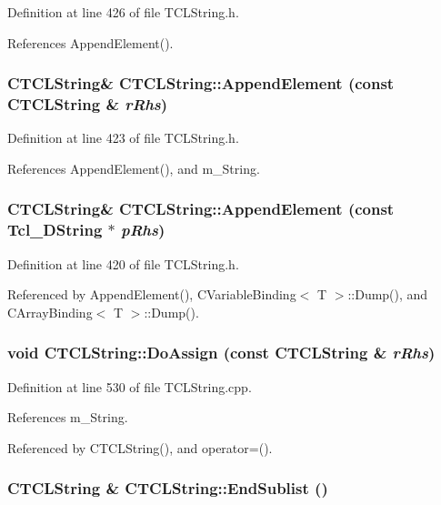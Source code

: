 Definition at line 426 of file TCLString.h.

References Append\-Element().
\subsubsection{\setlength{\rightskip}{0pt plus 5cm}CTCLString\& CTCLString::Append\-Element (const CTCLString \& {\em r\-Rhs})\hspace{0.3cm}{\tt  [inline]}}\label{classCTCLString_a20}




Definition at line 423 of file TCLString.h.

References Append\-Element(), and m\_\-String.
\subsubsection{\setlength{\rightskip}{0pt plus 5cm}CTCLString\& CTCLString::Append\-Element (const Tcl\_\-DString $\ast$ {\em p\-Rhs})\hspace{0.3cm}{\tt  [inline]}}\label{classCTCLString_a19}




Definition at line 420 of file TCLString.h.

Referenced by Append\-Element(), CVariable\-Binding$<$ T $>$::Dump(), and CArray\-Binding$<$ T $>$::Dump().
\subsubsection{\setlength{\rightskip}{0pt plus 5cm}void CTCLString::Do\-Assign (const CTCLString \& {\em r\-Rhs})\hspace{0.3cm}{\tt  [protected]}}\label{classCTCLString_b0}




Definition at line 530 of file TCLString.cpp.

References m\_\-String.

Referenced by CTCLString(), and operator=().
\subsubsection{\setlength{\rightskip}{0pt plus 5cm}CTCLString \& CTCLString::End\-Sublist ()}\label{classCTCLString_a24}




